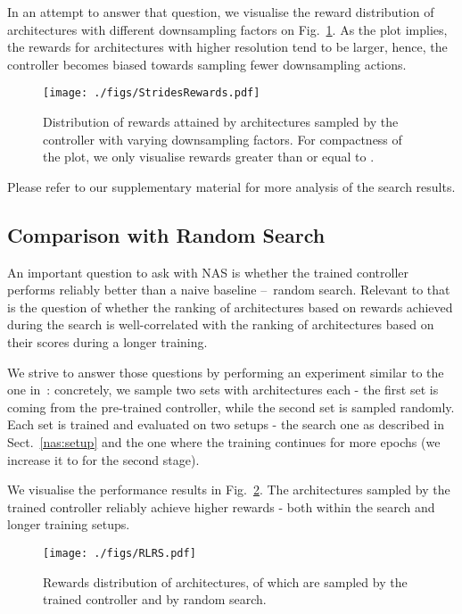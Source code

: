 \documentclass[10pt,twocolumn,letterpaper]{article}
\begin{document}
In an attempt to answer that question, we visualise the reward distribution of architectures with different downsampling factors on Fig.~\ref{fig:strides:rewards}. As the plot implies, the rewards for architectures with higher resolution tend to be larger, hence, the controller becomes biased towards sampling fewer downsampling actions.

\begin{figure}[thb]
	\begin{center}
		\texttt{[image: ./figs/StridesRewards.pdf]}
	\end{center}
	\vskip -0.2in
	\caption{
		Distribution of rewards attained by architectures sampled by the controller with varying downsampling factors. For compactness of the plot, we only visualise rewards greater than or equal to .\label{fig:strides:rewards}}
\end{figure}

Please refer to our supplementary material for more analysis of the search results.

\subsection{Comparison with Random Search}

An important question to ask with NAS is whether the trained controller performs reliably better than a naive baseline --~\eg random search. Relevant to that is the question of whether the ranking of architectures based on rewards achieved during the search is well-correlated with the ranking of architectures based on their scores during a longer training.

We strive to answer those questions by performing an experiment similar to the one in~\cite{abs-1810-10804}: concretely, we sample two sets with  architectures each - the first set is coming from the pre-trained controller, while the second set is sampled randomly. Each set is trained and evaluated on two setups - the search one as described in Sect.~\ref{nas:setup} and the one where the training continues for more epochs (we increase it to  for the second stage).

We visualise the performance results in Fig.~\ref{fig:rlrs}. The architectures sampled by the trained controller reliably achieve higher rewards - both within the search and longer training setups.

\begin{figure}[thb]
	\begin{center}
		\texttt{[image: ./figs/RLRS.pdf]}
	\end{center}
	\vskip -0.2in
	\caption{Rewards distribution of  architectures,  of which are sampled by the trained controller and  by random search.\label{fig:rlrs}}
\end{figure}
\end{document}
